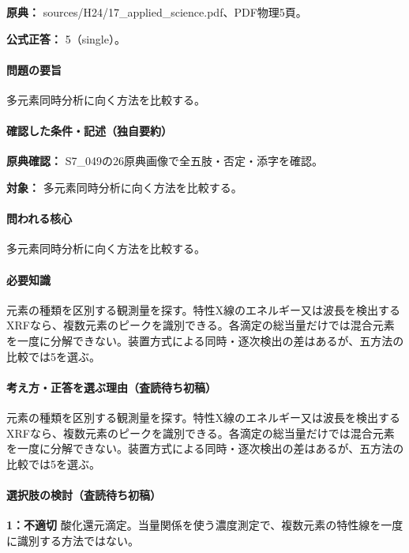 \noindent\textbf{原典：} sources/H24/17\_applied\_science.pdf、PDF物理5頁。

\textbf{公式正答：} 5（single）。

\paragraph{問題の要旨} 多元素同時分析に向く方法を比較する。

\paragraph{確認した条件・記述（独自要約）}\mbox{}\par

\noindent\textbf{原典確認：} S7\_049の26原典画像で全五肢・否定・添字を確認。\par

\noindent\textbf{対象：} 多元素同時分析に向く方法を比較する。\par

\paragraph{問われる核心} 多元素同時分析に向く方法を比較する。

\paragraph{必要知識} 元素の種類を区別する観測量を探す。特性X線のエネルギー又は波長を検出するXRFなら、複数元素のピークを識別できる。各滴定の総当量だけでは混合元素を一度に分解できない。装置方式による同時・逐次検出の差はあるが、五方法の比較では5を選ぶ。

\paragraph{考え方・正答を選ぶ理由（査読待ち初稿）} 元素の種類を区別する観測量を探す。特性X線のエネルギー又は波長を検出するXRFなら、複数元素のピークを識別できる。各滴定の総当量だけでは混合元素を一度に分解できない。装置方式による同時・逐次検出の差はあるが、五方法の比較では5を選ぶ。

\paragraph{選択肢の検討（査読待ち初稿）}\mbox{}\par

\noindent\textbf{1：不適切} 酸化還元滴定。当量関係を使う濃度測定で、複数元素の特性線を一度に識別する方法ではない。\par

